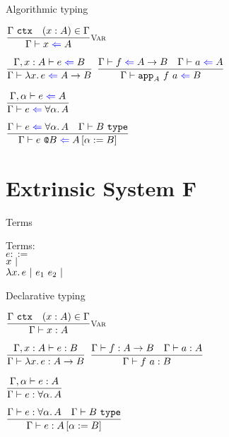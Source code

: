 \documentclass{beamer}
\begin{document}
\begin{frame}{Algorithmic typing}

\begin{center}
  $\infrule[Var]{\tyctx{\Gamma} \quad \sidecond{(x : A) \in \Gamma}}{\check{x}{A}}$

  \vspace{2em}

  $\infrule{\fullcheck{\extend{\Gamma}{x}{A}}{e}{B}}{\check{\fun{x}{e}}{\Fun{A}{B}}}$ \quad
  $\infrule{\check{f}{\Fun{A}{B}} \quad \check{a}{A}}{\check{\iapp{A}{f}{a}}{B}}$

  \vspace{2em}

  $\infrule{\fullcheck{\extendtype{\Gamma}{\alpha}}{e}{A}}{\check{e}{\ForallT{\alpha}{A}}}$

  \vspace{2em}

  $\infrule{\check{e}{\ForallT{\alpha}{A}} \quad \type{B}}{\check{\tapp{e}{B}}{\subst{A}{\alpha}{B}}}$
\end{center}

\end{frame}

\section{Extrinsic System F}

\begin{frame}{Terms}

Terms: \\
$e ::=$ \\
\qquad $x \pipe $ \\
\qquad $\fun{x}{e} \pipe \app{e_1}{e_2} \pipe$

\end{frame}

\begin{frame}{Declarative typing}

\begin{center}
  $\infrule[Var]{\tyctx{\Gamma} \quad \sidecond{(x : A) \in \Gamma}}{\typing{x}{A}}$

  \vspace{2em}

  $\infrule{\fulltyping{\extend{\Gamma}{x}{A}}{e}{B}}{\typing{\fun{x}{e}}{\Fun{A}{B}}}$ \quad
  $\infrule{\typing{f}{\Fun{A}{B}} \quad \typing{a}{A}}{\typing{\app{f}{a}}{B}}$

  \vspace{2em}

  $\infrule{\fulltyping{\extendtype{\Gamma}{\alpha}}{e}{A}}{\typing{e}{\ForallT{\alpha}{A}}}$

  \vspace{2em}

  $\infrule{\typing{e}{\ForallT{\alpha}{A}} \quad \type{B}}{\typing{e}{\subst{A}{\alpha}{B}}}$
\end{center}

\end{frame}
\end{document}
